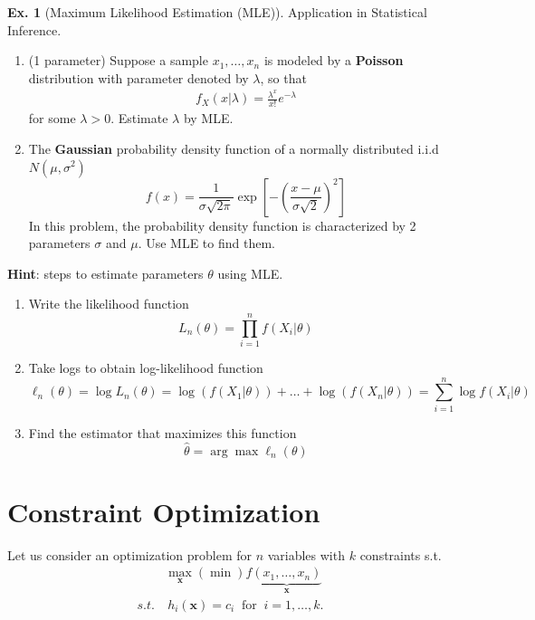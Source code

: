\documentclass[11pt,a4paper]{book}
\theoremstyle{definition}\newtheorem{definition}{Definition}
\theoremstyle{definition}\newtheorem{fact}{Fact}
\theoremstyle{definition}\newtheorem{remark}{Remark}
\theoremstyle{definition}\newtheorem{ex}{Ex.}
\theoremstyle{definition}\newtheorem{project}{Project}
\theoremstyle{definition}\newtheorem{problem}{Problem}
\theoremstyle{definition}\newtheorem{example}{Example}
\numberwithin{theorem}{section}
\numberwithin{corollary}{chapter}
\numberwithin{assumption}{chapter}
\numberwithin{definition}{chapter}
\numberwithin{prop}{chapter}
\numberwithin{notation}{chapter}
\numberwithin{problem}{chapter}
\numberwithin{example}{chapter}
\numberwithin{fact}{chapter}
\numberwithin{ex}{chapter}
\def\x{\mathbf x}
\begin{document}
	\begin{ex}[Maximum Likelihood Estimation (MLE)]
		Application in Statistical Inference.
		\begin{enumerate}
		\item (1 parameter) Suppose a sample $x_1, \dots, x_n$ is modeled by a \textbf{Poisson} distribution with parameter denoted by $\lambda$, so that
		\begin{align*}
			f_X(x | \lambda) = \frac{\lambda^x}{x!} e^{-\lambda}
		\end{align*}
		for some $\lambda > 0$. Estimate $\lambda$ by MLE.
		\item The \textbf{Gaussian} probability density function of a normally distributed i.i.d $N(\mu, \sigma^2)$
		$$
		f(x) = \frac{1}{\sigma \sqrt{2\pi}} \exp\left[{-\left( \frac{x-\mu}{\sigma\sqrt{2}} \right)^2}\right]
		$$
		In this problem, the probability density function is characterized by 2 parameters $\sigma$ and $\mu$. Use MLE to find them.
		\end{enumerate}
		\textbf{Hint}: steps to estimate parameters $\theta$ using MLE.
		\begin{enumerate}
			\item Write the likelihood function 
			$$
			L_n (\theta) = \prod^n_{i=1} f(X_i|\theta)
			$$
			\item Take logs to obtain log-likelihood function
			$$
			\ell_n (\theta) = \log L_n(\theta) = \log(f(X_1|\theta)) + \dots + \log(f(X_n|\theta))  = \sum^n_{i=1} \log f(X_i|\theta)
			$$
			\item Find the estimator that maximizes this function
			$$
			\hat{\theta} = \arg \max \ell_n(\theta) 
			$$
		\end{enumerate}
	\end{ex}
	
	\newpage	
	\section{Constraint Optimization}
		Let us consider an optimization problem for $n$ variables with $k$ constraints s.t.
	\begin{align*}
		& \max_{\x} (\min) f \underbrace{(x_1, \dots, x_n)}_{\x} \\
		s.t. &\ h_i (\x) = c_i \ \text{ for } \ i = 1, \dots, k. &                                                        
	\end{align*}
	
\end{document}
